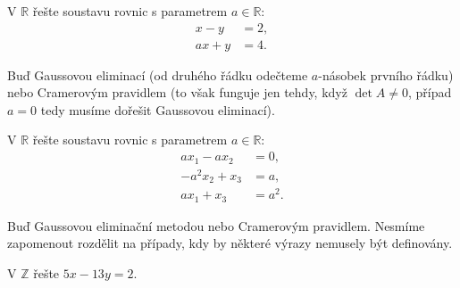 \begin{priklad}
V $\mathbb R$ řešte soustavu rovnic s parametrem $a \in \mathbb R:$
\begin{align*}
    x-y &=2,\\
    ax+y &=4.
\end{align*}
\end{priklad}

\begin{reseni}
Buď Gaussovou eliminací (od druhého řádku odečteme $a$-násobek prvního řádku) nebo
Cramerovým pravidlem (to však funguje jen tehdy, když $\det A \ne 0$, případ $a=0$ tedy
musíme dořešit Gaussovou eliminací).
\end{reseni}

\begin{priklad}
V $\mathbb R$ řešte soustavu rovnic s parametrem $a\in \mathbb R:$
\begin{align*}
    ax_1-ax_2 &=0,\\
    -a^2x_2+x_3 &=a,\\
    ax_1 + x_3 &= a^2.
\end{align*}
\end{priklad}

\begin{reseni}
Buď Gaussovou eliminační metodou nebo Cramerovým pravidlem. Nesmíme zapomenout
rozdělit na případy, kdy by některé výrazy nemusely být definovány.
\end{reseni}

\begin{priklad}
V $\mathbb Z$ řešte $5x-13y=2.$
\end{priklad}

